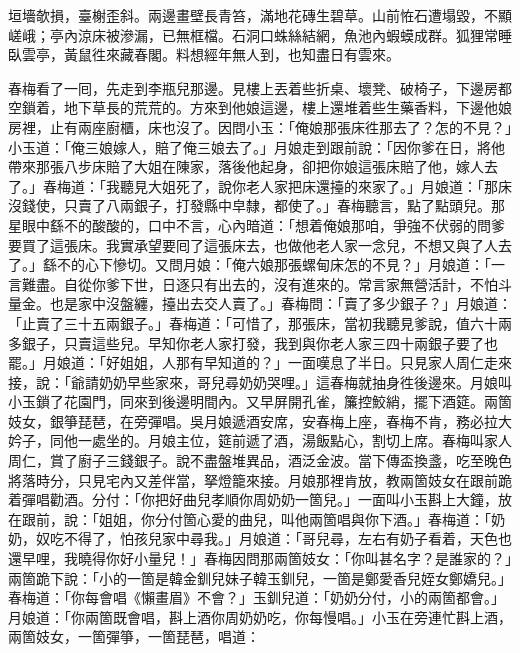 \begin{myquote}
垣墻欹損，臺榭歪斜。兩邊畫壁長青笞，滿地花磚生碧草。山前恠石遭塌毀，不顯嵯峨；亭內涼床被滲漏，已無框檔。石洞口蛛絲結網，魚池內蝦蟆成群。狐狸常睡臥雲亭，黃鼠徃來藏春閣。料想經年無人到，也知盡日有雲來。
\end{myquote}

春梅看了一囘，先走到李瓶兒那邊。見樓上丟着些折桌、壞凳、破椅子，下邊房都空鎖着，地下草長的荒荒的。{}方來到他娘這邊，樓上還堆着些生藥香料，下邊他娘房裡，止有兩座廚櫃，床也沒了。因問小玉：「俺娘那張床徃那去了？怎的不見？」小玉道：「俺三娘嫁人，賠了俺三娘去了。」月娘走到跟前說：「因你爹在日，將他帶來那張八步床賠了大姐在陳家，落後他起身，卻把你娘這張床賠了他，嫁人去了。」春梅道：「我聽見大姐死了，說你老人家把床還擡的來家了。」月娘道：「那床沒錢使，只賣了八兩銀子，打發縣中皁隸，都使了。」春梅聽言，點了點頭兒。那星眼中繇不的酸酸的，口中不言，心內暗道：「想着俺娘那咱，爭強不伏弱的問爹要買了這張床。我實承望要囘了這張床去，也做他老人家一念兒，不想又與了人去了。」繇不的心下慘切。{}又問月娘：「俺六娘那張螺甸床怎的不見？」月娘道：「一言難盡。自從你爹下世，日逐只有出去的，沒有進來的。常言家無營活計，不怕斗量金。也是家中沒盤纏，擡出去交人賣了。」春梅問：「賣了多少銀子？」月娘道：「止賣了三十五兩銀子。」春梅道：「可惜了，那張床，當初我聽見爹說，值六十兩多銀子，只賣這些兒。早知你老人家打發，我到與你老人家三四十兩銀子要了也罷。」月娘道：「好姐姐，人那有早知道的？」一面嘆息了半日。只見家人周仁走來接，說：「爺請奶奶早些家來，哥兒尋奶奶哭哩。」這春梅就抽身徃後邊來。月娘叫小玉鎖了花園門，同來到後邊明間內。又早屏開孔雀，簾控鮫綃，擺下酒筵。兩箇妓女，銀箏琵琶，在旁彈唱。吳月娘遞酒安席，安春梅上座，{}春梅不肯，務必拉大妗子，同他一處坐的。月娘主位，筵前遞了酒，湯飯點心，割切上席。春梅叫家人周仁，賞了廚子三錢銀子。說不盡盤堆異品，酒泛金波。當下傳盃換盞，吃至晚色將落時分，只見宅內又差伴當，拏燈籠來接。月娘那裡肯放，教兩箇妓女在跟前跪着彈唱勸酒。分付：「你把好曲兒孝順你周奶奶一箇兒。」一面叫小玉斟上大鐘，放在跟前，說：「姐姐，你分付箇心愛的曲兒，叫他兩箇唱與你下酒。」春梅道：「奶奶，奴吃不得了，怕孩兒家中尋我。」月娘道：「哥兒尋，左右有奶子看着，天色也還早哩，我曉得你好小量兒！」春梅因問那兩箇妓女：「你叫甚名字？是誰家的？」兩箇跪下說：「小的一箇是韓金釧兒妹子韓玉釧兒，一箇是鄭愛香兒姪女鄭嬌兒。」春梅道：「你每會唱《懶畫眉》不會？」玉釧兒道：「奶奶分付，小的兩箇都會。」月娘道：「你兩箇既會唱，斟上酒你周奶奶吃，你每慢唱。」小玉在旁連忙斟上酒，兩箇妓女，一箇彈箏，一箇琵琶，唱道：


